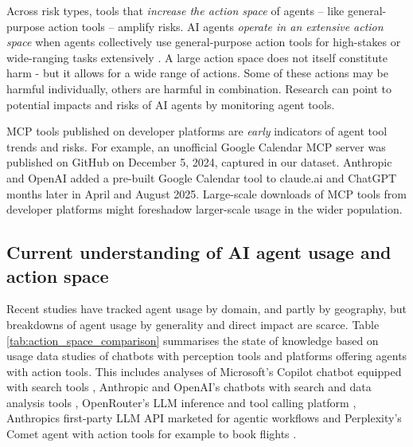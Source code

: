 \documentclass[manuscript,screen,nonacm,oneside]{acmart}
\begin{document}
Across risk types, tools that \textit{increase the action space} of agents – like general-purpose action tools – amplify risks. AI agents \textit{operate in an extensive action space} when agents collectively use general-purpose action tools for high-stakes or wide-ranging tasks extensively \citep{mitchell2025fullyautonomousaiagents}. A large action space does not itself constitute harm - but it allows for a wide range of actions. Some of these actions may be harmful individually, others are harmful in combination. Research can point to potential impacts and risks of AI agents by monitoring agent tools.

MCP tools published on developer platforms are \emph{early} indicators of agent tool trends and risks. For example, an unofficial Google Calendar MCP server was published on GitHub \citep{githubGitHubMarkelaugust74mcpgooglecalendar} on December 5, 2024, captured in our dataset. Anthropic \citep{Anthropic2025claude} and OpenAI \citep{openaiChatGPTRelease} added a pre-built Google Calendar tool to claude.ai and ChatGPT months later in April and August 2025. Large-scale downloads of MCP tools from developer platforms might foreshadow larger-scale usage in the wider population. 

\subsection{Current understanding of AI agent usage and action space}

Recent studies have tracked agent usage by domain, and partly by geography, but breakdowns of agent usage by generality and direct impact are scarce. Table \ref{tab:action_space_comparison} summarises the state of knowledge based on usage data studies of chatbots with perception tools and platforms offering agents with action tools. This includes analyses of Microsoft's Copilot chatbot equipped with search tools \citep{yang2025adoption}, Anthropic and OpenAI's chatbots with search and data analysis tools \citep{handa2025which} \citep{chatterji2025people}, OpenRouter's LLM inference and tool calling platform \citep{aubakirova2025state}, Anthropics first-party LLM API marketed for agentic workflows \citep{handa2025which} and Perplexity's Comet agent with action tools for example to book flights \citep{perplexityCometBrowser}.
\end{document}
